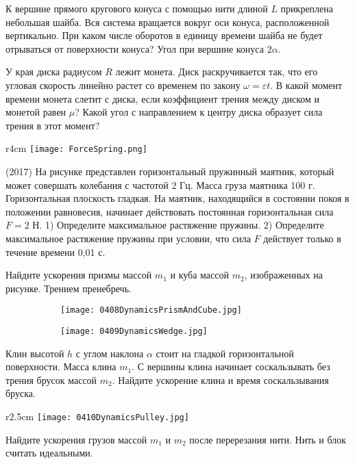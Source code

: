 \AddProb К вершине прямого кругового конуса с помощью нити длиной $L$ прикреплена небольшая шайба. 
Вся система вращается вокруг оси конуса, расположенной вертикально. 
При каком числе оборотов в единицу времени шайба не будет отрываться от поверхности конуса? Угол при вершине конуса $2\alpha$.

\AddProb У края диска радиусом $R$ лежит монета. Диск раскручивается так, 
что его угловая скорость линейно растет со временем по закону $\omega = \varepsilon t$. 
В какой момент времени монета слетит с диска, если коэффициент трения между диском и монетой равен $\mu$? 
Какой угол с направлением к центру диска образует сила трения в этот момент?

\begin{wrapfigure}{r}{4cm}
\texttt{[image: ForceSpring.png]}
\end{wrapfigure}
\AddProb (2017) На рисунке представлен горизонтальный пружинный маятник, который может совершать колебания с частотой 2 Гц. Масса груза маятника 100 г. Горизонтальная плоскость гладкая. На маятник, находящийся в состоянии покоя в положении равновесия, начинает действовать постоянная горизонтальная сила $F = 2$ Н. 1) Определите максимальное растяжение пружины. 2) Определите максимальное растяжение пружины при условии, что сила $F$ действует только в течение времени 0,01 с.

\AddProb Найдите ускорения призмы массой $m_1$ и куба массой $m_2$, изображенных на рисунке. Трением пренебречь.

\begin{figure}[!h]
	\begin{subfigure}{.5\textwidth}
		\centering
		\texttt{[image: 0408DynamicsPrismAndCube.jpg]}
	\end{subfigure}
	\begin{subfigure}{.5\textwidth}
		\centering
		\texttt{[image: 0409DynamicsWedge.jpg]}
	\end{subfigure}
\end{figure}

\AddProb Клин высотой $h$ с углом наклона $\alpha$ стоит на гладкой горизонтальной поверхности. 
Масса клина $m_1$. С вершины клина начинает соскальзывать без трения брусок массой $m_2$. Найдите ускорение клина и время соскальзывания бруска.

\begin{wrapfigure}{r}{2.5cm}
\texttt{[image: 0410DynamicsPulley.jpg]}
\end{wrapfigure}

\AddProb Найдите ускорения грузов массой $m_1$ и $m_2$ после перерезания нити. Нить и блок считать идеальными.

